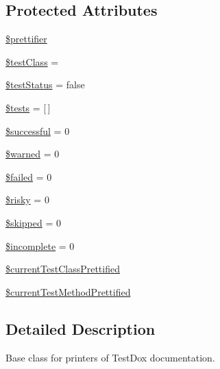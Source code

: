 \subsection*{Protected Attributes}
\begin{DoxyCompactItemize}
\item 
\mbox{\hyperlink{class_p_h_p_unit___util___test_dox___result_printer_a2b763303e7af7d22b1281665eef0e25f}{\$prettifier}}
\item 
\mbox{\hyperlink{class_p_h_p_unit___util___test_dox___result_printer_acab21ea5257c15a93e9004f26a3159f6}{\$test\+Class}} = \textquotesingle{}\textquotesingle{}
\item 
\mbox{\hyperlink{class_p_h_p_unit___util___test_dox___result_printer_a1c74f23faacfd77639290911e74d5f94}{\$test\+Status}} = false
\item 
\mbox{\hyperlink{class_p_h_p_unit___util___test_dox___result_printer_a6d7f4b753e7eb18b328a7eeba5e0094f}{\$tests}} = \mbox{[}$\,$\mbox{]}
\item 
\mbox{\hyperlink{class_p_h_p_unit___util___test_dox___result_printer_abdc0098b3ead0fb819e232570620128d}{\$successful}} = 0
\item 
\mbox{\hyperlink{class_p_h_p_unit___util___test_dox___result_printer_a3cb10014d31996a3ef3a722cc0ab3dac}{\$warned}} = 0
\item 
\mbox{\hyperlink{class_p_h_p_unit___util___test_dox___result_printer_a145d4f1dd5e06d4d3d49ebc01751747a}{\$failed}} = 0
\item 
\mbox{\hyperlink{class_p_h_p_unit___util___test_dox___result_printer_a06dd16ff404a50a8a5956a5bec512fec}{\$risky}} = 0
\item 
\mbox{\hyperlink{class_p_h_p_unit___util___test_dox___result_printer_a6a413fb7294de7b959542d9b02acafce}{\$skipped}} = 0
\item 
\mbox{\hyperlink{class_p_h_p_unit___util___test_dox___result_printer_a66461165be89ec200ed6470ed1bcf181}{\$incomplete}} = 0
\item 
\mbox{\hyperlink{class_p_h_p_unit___util___test_dox___result_printer_aa821bfe1fe69e2ffb0e3969e844b6359}{\$current\+Test\+Class\+Prettified}}
\item 
\mbox{\hyperlink{class_p_h_p_unit___util___test_dox___result_printer_a7f6621f782c7ec71efa11f554b5de6c0}{\$current\+Test\+Method\+Prettified}}
\end{DoxyCompactItemize}


\subsection{Detailed Description}
Base class for printers of Test\+Dox documentation. 

